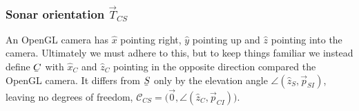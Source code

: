 %


\subsubsection{Sonar orientation \texorpdfstring{$\vec{T}_{CS}$}{T\_CS}}

%


An OpenGL camera has $\hat{x}$ pointing right, $\hat{y}$ pointing up and $\hat{z}$ pointing into the camera. Ultimately we must adhere to this, but to keep things familiar we instead define $\ubar{C}$ with $\hat{x}_C$ and $\hat{z}_C$ pointing in the opposite direction compared the OpenGL camera. It differs from $\ubar{S}$ only by the elevation angle $\angle(\hat{z}_S,\vec{p}_{SI})$, leaving no degrees of freedom, $\mathcal{C}_{CS} = \big(\vec{0},\angle(\hat{z}_C,\vec{p}_{CI})\big)$.
%
%
%
%
%
%
%
%
%
%

